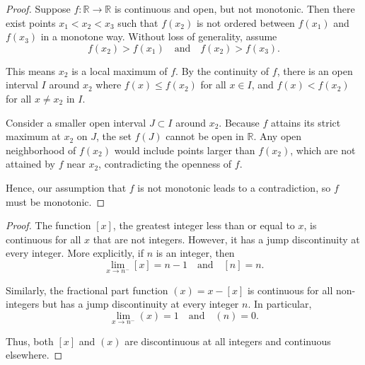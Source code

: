 \documentclass[11pt]{article}
\begin{document}
\begin{exercise}{15}
    \begin{proof}
        Suppose $f:\mathbb{R} \to \mathbb{R}$ is continuous and open, but not monotonic.
Then there exist points $x_1 < x_2 < x_3$ such that $f(x_2)$ is not
ordered between $f(x_1)$ and $f(x_3)$ in a monotone way. Without loss of
generality, assume
\[
f(x_2) > f(x_1) \quad \text{and} \quad f(x_2) > f(x_3).
\]

This means $x_2$ is a local maximum of $f$. By the continuity of $f$, there is
an open interval $I$ around $x_2$ where $f(x) \le f(x_2)$ for all $x \in I$, and
$f(x) < f(x_2)$ for all $x \neq x_2$ in $I$.

Consider a smaller open interval $J \subset I$ around $x_2$. Because
$f$ attains its strict maximum at $x_2$ on $J$, the set $f(J)$ cannot be open in
$\mathbb{R}$. Any open neighborhood of $f(x_2)$ would include points larger than
$f(x_2)$, which are not attained by $f$ near $x_2$, contradicting the openness
of $f$.

Hence, our assumption that $f$ is not monotonic leads to a contradiction, so $f$ must be monotonic.
    \end{proof}
\end{exercise}

\begin{exercise}{16}
    \begin{proof}
        The function $[x]$, the greatest integer less than or equal to $x$, is
continuous for all $x$ that are not integers. However, it has a jump
discontinuity at every integer. More explicitly, if $n$ is an integer,
then
\[
\lim_{x \to n^-} [x] = n-1 \quad \text{and} \quad [n] = n.
\]

Similarly, the fractional part function $(x) = x - [x]$ is continuous for
all non-integers but has a jump discontinuity at every integer $n$. In
particular,
\[
\lim_{x \to n^-} (x) = 1 \quad \text{and} \quad (n) = 0.
\]

Thus, both $[x]$ and $(x)$ are discontinuous at all integers and continuous
elsewhere.
    \end{proof}    
\end{exercise}
\end{document}
